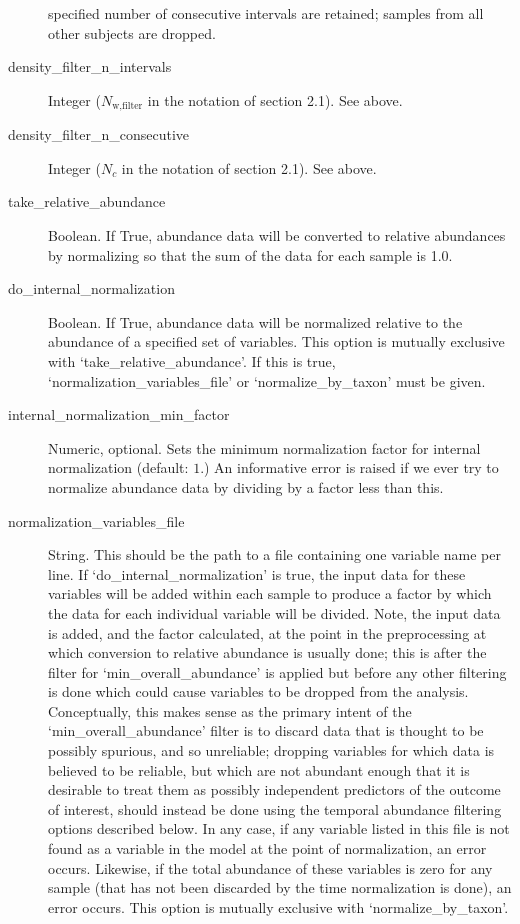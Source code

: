 \documentclass[12pt]{report}
\begin{document}
\begin{description}
  specified number of consecutive intervals are retained; samples from
  all other subjects are dropped.
\item[density\_filter\_n\_intervals] Integer ($N_\text{w,filter}$ in
  the notation of section 2.1). See above.
\item[density\_filter\_n\_consecutive] Integer ($N_c$ in the notation
  of section 2.1). See above.
\item[take\_relative\_abundance] Boolean. If True, abundance data will
  be converted to relative abundances by normalizing so that the sum
  of the data for each sample is 1.0.
\item[do\_internal\_normalization] Boolean. If True, abundance data will
  be normalized relative to the abundance of a specified set of variables.
  This option is mutually exclusive with `take\_relative\_abundance'.
  If this is true, `normalization\_variables\_file' or `normalize\_by\_taxon'
  must be given.
\item[internal\_normalization\_min\_factor] Numeric, optional.  Sets
  the minimum normalization factor for internal normalization
  (default: $1$.) An informative error is raised if we ever try to
  normalize abundance data by dividing by a factor less than this.
\item[normalization\_variables\_file] String. This should be the path
  to a file containing one variable name per line. If
  `do\_internal\_normalization' is true, the input data for these
  variables will be added within each sample to produce a factor by
  which the data for each individual variable will be divided. Note,
  the input data is added, and the factor calculated, at the point in
  the preprocessing at which conversion to relative abundance is
  usually done; this is after the filter for `min\_overall\_abundance'
  is applied but before any other filtering is done which could cause
  variables to be dropped from the analysis.  Conceptually, this makes
  sense as the primary intent of the `min\_overall\_abundance' filter
  is to discard data that is thought to be possibly spurious, and so
  unreliable; dropping variables for which data is believed to be
  reliable, but which are not abundant enough that it is desirable to treat
  them as possibly independent predictors of the outcome of interest, should
  instead be done using the temporal abundance filtering options described
  below. In any case, if any variable listed in this file is not found
  as a variable in the model at the point of normalization, an error occurs.
  Likewise, if the total abundance of these variables is zero for any sample
  (that has not been discarded by the time normalization is done), an error
  occurs. This option is mutually exclusive with `normalize\_by\_taxon'.


\end{description}
\end{document}
